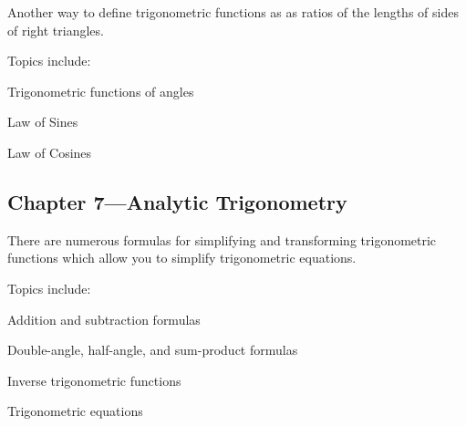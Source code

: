 \documentclass[fleqn, onecolumn]{article}
\begin{document}
  Another way to define trigonometric functions as as ratios of the lengths of sides of right triangles.

  Topics include:
  \begin{itemize*}
    \item Trigonometric functions of angles
    \item Law of Sines
    \item Law of Cosines
  \end{itemize*}

  \subsection{Chapter 7---Analytic Trigonometry}

  There are numerous formulas for simplifying and transforming trigonometric functions which allow you to simplify
  trigonometric equations.

  Topics include:
  \begin{itemize*}
    \item Addition and subtraction formulas
    \item Double-angle, half-angle, and sum-product formulas
    \item Inverse trigonometric functions
    \item Trigonometric equations
  \end{itemize*}
\end{document}
